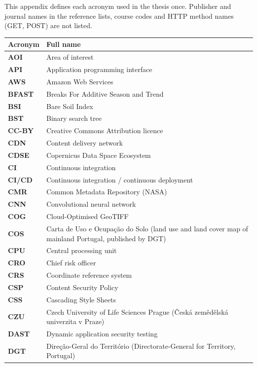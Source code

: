 

This appendix defines each acronym used in the thesis once. Publisher and journal names in the reference lists, course codes and HTTP method names (GET, POST) are not listed.

{\small
\begin{longtable}{>{\raggedright\arraybackslash}p{3.68cm}>{\raggedright\arraybackslash}p{10.52cm}}
\toprule
Acronym & Full name \\
\midrule
\endhead
\textbf{AOI} & Area of interest \\
\textbf{API} & Application programming interface \\
\textbf{AWS} & Amazon Web Services \\
\textbf{BFAST} & Breaks For Additive Season and Trend \\
\textbf{BSI} & Bare Soil Index \\
\textbf{BST} & Binary search tree \\
\textbf{CC-BY} & Creative Commons Attribution licence \\
\textbf{CDN} & Content delivery network \\
\textbf{CDSE} & Copernicus Data Space Ecosystem \\
\textbf{CI} & Continuous integration \\
\textbf{CI/CD} & Continuous integration / continuous deployment \\
\textbf{CMR} & Common Metadata Repository (NASA) \\
\textbf{CNN} & Convolutional neural network \\
\textbf{COG} & Cloud-Optimised GeoTIFF \\
\textbf{COS} & Carta de Uso e Ocupação do Solo (land use and land cover map of mainland Portugal, published by DGT) \\
\textbf{CPU} & Central processing unit \\
\textbf{CRO} & Chief risk officer \\
\textbf{CRS} & Coordinate reference system \\
\textbf{CSP} & Content Security Policy \\
\textbf{CSS} & Cascading Style Sheets \\
\textbf{CZU} & Czech University of Life Sciences Prague (Česká zemědělská univerzita v Praze) \\
\textbf{DAST} & Dynamic application security testing \\
\textbf{DGT} & Direção-Geral do Território (Directorate-General for Territory, Portugal) \\

\end{longtable}}
